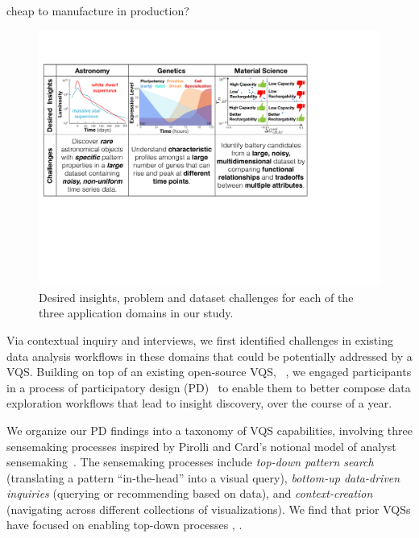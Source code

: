  cheap to manufacture in production?
 \begin{figure}[ht!]
 	\centering
 	\includegraphics[width=\linewidth]{figures/science_goal.pdf}
 	\caption{Desired insights, problem and dataset challenges for each of the three application domains in our study.}
 	\label{science_goal}
 	\vspace*{-15pt}
 \end{figure}
 \par Via contextual inquiry and interviews, we first identified challenges in existing data analysis workflows in these domains
 that could be potentially addressed by a VQS. Building on top of an existing open-source VQS, \zv~\cite{Siddiqui2017,Siddiqui2017VLDB}, we engaged participants in a process of participatory design (PD)~\cite{Muller1993,BodkerGronbaek,HoltzblattJones} to enable them to better compose data exploration workflows that lead to insight discovery, over the course of a year.  
 \par We organize our PD findings into a taxonomy of VQS capabilities, involving three sensemaking processes inspired by Pirolli and Card's notional model of analyst sensemaking~\cite{Pirolli}. The sensemaking processes include \emph{top-down pattern search} (translating a pattern ``in-the-head'' into a visual query), \emph{bottom-up data-driven inquiries} (querying or recommending based on data), and \emph{context-creation} (navigating across different collections of visualizations). We find that prior VQSs have focused on enabling top-down processes , .
